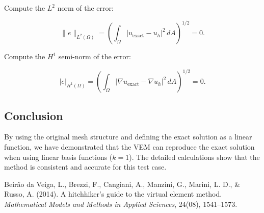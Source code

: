 \documentclass[class=article, crop=false]{standalone}
\begin{document}
Compute the \( L^2 \) norm of the error:

\[
\| e \|_{L^2(\Omega)} = \left( \int_{\Omega} |u_{\text{exact}} - u_h|^2 \, dA \right)^{1/2} = 0.
\]

Compute the \( H^1 \) semi-norm of the error:

\[
| e |_{H^1(\Omega)} = \left( \int_{\Omega} |\nabla u_{\text{exact}} - \nabla u_h|^2 \, dA \right)^{1/2} = 0.
\]

\subsection{Conclusion}

By using the original mesh structure and defining the exact solution as a linear function, we have demonstrated that the VEM can reproduce the exact solution when using linear basis functions (\( k = 1 \)). The detailed calculations show that the method is consistent and accurate for this test case.

\begin{thebibliography}{9}

Beir{\~a}o da Veiga, L., Brezzi, F., Cangiani, A., Manzini, G., Marini, L. D., \& Russo, A. (2014). A hitchhiker's guide to the virtual element method. \textit{Mathematical Models and Methods in Applied Sciences}, 24(08), 1541--1573.

\end{thebibliography}
\end{document}
